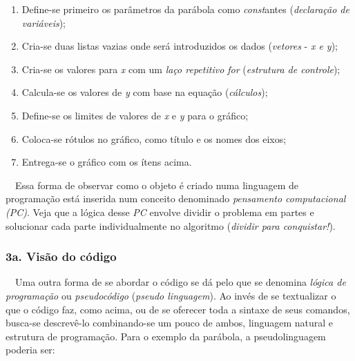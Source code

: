 \documentclass[
  portuguese,
  letterpaper,
  DIV=11,
  numbers=noendperiod]{scrreprt}
\providecommand{\tightlist}{%
  \setlength{\itemsep}{0pt}\setlength{\parskip}{0pt}}
\begin{document}
\begin{enumerate}
\def\labelenumi{\arabic{enumi}.}
\tightlist
\item
  Define-se primeiro os parâmetros da parábola como \emph{const}antes
  (\emph{declaração de variáveis});
\item
  Cria-se duas listas vazias onde será introduzidos os dados
  (\emph{vetores} - \emph{x e y});
\item
  Cria-se os valores para \emph{x} com um \emph{laço repetitivo for}
  (\emph{estrutura de controle});
\item
  Calcula-se os valores de \emph{y} com base na equação
  (\emph{cálculos});
\item
  Define-se os limites de valores de \emph{x} e \emph{y} para o gráfico;
\item
  Coloca-se rótulos no gráfico, como título e os nomes dos eixos;
\item
  Entrega-se o gráfico com os ítens acima.
\end{enumerate}

~~Essa forma de observar como o objeto é criado numa linguagem de
programação está inserida num conceito denominado \emph{pensamento
computacional (PC)}. Veja que a lógica desse \emph{PC} envolve dividir o
problema em partes e solucionar cada parte individualmente no algoritmo
(\emph{dividir para conquistar!}).

\subsubsection*{3a. Visão do código}\label{a.-visuxe3o-do-cuxf3digo-2}

~~Uma outra forma de se abordar o código se dá pelo que se denomina
\emph{lógica de programação} ou \emph{pseudocódigo} (\emph{pseudo
linguagem}). Ao invés de se textualizar o que o código faz, como acima,
ou de se oferecer toda a sintaxe de seus comandos, busca-se descrevê-lo
combinando-se um pouco de ambos, linguagem natural e estrutura de
programação. Para o exemplo da parábola, a pseudolinguagem poderia ser:

\hfill\break
\end{document}

